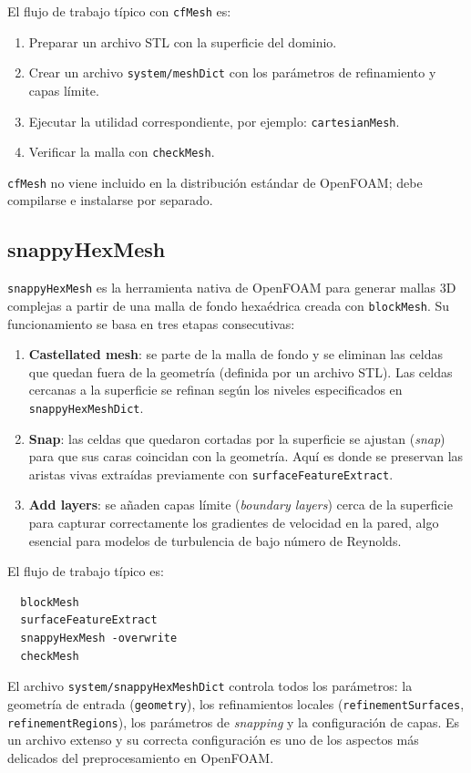 El flujo de trabajo típico con \texttt{cfMesh} es:
\begin{enumerate}
  \item Preparar un archivo STL con la superficie del dominio.
  \item Crear un archivo \texttt{system/meshDict} con los parámetros de refinamiento y capas límite.
  \item Ejecutar la utilidad correspondiente, por ejemplo: \texttt{cartesianMesh}.
  \item Verificar la malla con \texttt{checkMesh}.
\end{enumerate}

\texttt{cfMesh} no viene incluido en la distribución estándar de OpenFOAM; debe compilarse e instalarse por separado.

\subsection{snappyHexMesh}

\texttt{snappyHexMesh} es la herramienta nativa de OpenFOAM para generar mallas 3D complejas a partir de una malla de fondo hexaédrica creada con \texttt{blockMesh}. Su funcionamiento se basa en tres etapas consecutivas:

\begin{enumerate}
  \item \textbf{Castellated mesh}: se parte de la malla de fondo y se eliminan las celdas que quedan fuera de la geometría (definida por un archivo STL). Las celdas cercanas a la superficie se refinan según los niveles especificados en \texttt{snappyHexMeshDict}.
  \item \textbf{Snap}: las celdas que quedaron cortadas por la superficie se ajustan (\textit{snap}) para que sus caras coincidan con la geometría. Aquí es donde se preservan las aristas vivas extraídas previamente con \texttt{surfaceFeatureExtract}.
  \item \textbf{Add layers}: se añaden capas límite (\textit{boundary layers}) cerca de la superficie para capturar correctamente los gradientes de velocidad en la pared, algo esencial para modelos de turbulencia de bajo número de Reynolds.
\end{enumerate}

El flujo de trabajo típico es:
\begin{verbatim}
  blockMesh
  surfaceFeatureExtract
  snappyHexMesh -overwrite
  checkMesh
\end{verbatim}

El archivo \texttt{system/snappyHexMeshDict} controla todos los parámetros: la geometría de entrada (\texttt{geometry}), los refinamientos locales (\texttt{refinementSurfaces}, \texttt{refinementRegions}), los parámetros de \textit{snapping} y la configuración de capas. Es un archivo extenso y su correcta configuración es uno de los aspectos más delicados del preprocesamiento en OpenFOAM.
